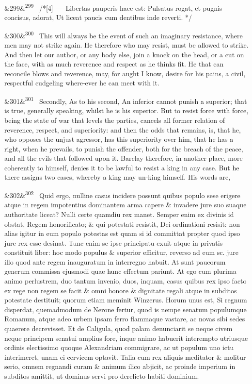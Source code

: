 \documentclass[12pt]{article}
\newcommand{\para}[1][]{\par\noindent\ifx&#1&\else\textsuperscript{\footnotesize #1}~\fi}
\begin{document}
\para[299] /*[4] -----Libertas pauperis haec est: Pulsatus rogat, et pugnis concisus, adorat, Ut liceat paucis cum dentibus inde reverti. */

\para[300] This will always be the event of such an imaginary resistance, where men may not strike again. He therefore who may resist, must be allowed to strike. And then let our author, or any body else, join a knock on the head, or a cut on the face, with as much reverence and respect as he thinks fit. He that can reconcile blows and reverence, may, for aught I know, desire for his pains, a civil, respectful cudgeling where-ever he can meet with it.

\para[301] Secondly, As to his second, An inferior cannot punish a superior; that is true, generally speaking, whilst he is his superior. But to resist force with force, being the state of war that levels the parties, cancels all former relation of reverence, respect, and superiority: and then the odds that remains, is, that he, who opposes the unjust agressor, has this superiority over him, that he has a right, when he prevails, to punish the offender, both for the breach of the peace, and all the evils that followed upon it. Barclay therefore, in another place, more coherently to himself, denies it to be lawful to resist a king in any case. But he there assigns two cases, whereby a king may un-king himself. His words are,

\para[302] Quid ergo, nulline casus incidere possunt quibus populo sese erigere atque in regem impotentius dominantem arma capere \& invadere jure suo suaque authoritate liceat? Nulli certe quamdiu rex manet. Semper enim ex divinis id obstat, Regem honorificato; \& qui potestati resistit, Dei ordinationi resisit: non alias igitur in eum populo potestas est quam si id committat propter quod ipso jure rex esse desinat. Tunc enim se ipse principatu exuit atque in privatis constituit liber: hoc modo populus \& superior efficitur, reverso ad eum sc. jure illo quod ante regem inauguratum in interregno habuit. At sunt paucorum generum commissa ejusmodi quae hunc effectum pariunt. At ego cum plurima animo perlustrem, duo tantum invenio, duos, inquam, casus quibus rex ipso facto ex rege non regem se facit \& omni honore \& dignitate regali atque in subditos potestate destituit; quorum etiam meminit Winzerus. Horum unus est, Si regnum disperdat, quemadmodum de Nerone fertur, quod is nempe senatum populumque Romanum, atque adeo urbem ipsam ferro flammaque vastare, ac novas sibi sedes quaerere decrevisset. Et de Caligula, quod palam denunciarit se neque civem neque principem senatui amplius fore, inque animo habuerit interempto utriusque ordinis electissimo quoque Alexandriam commigrare, ac ut populum uno ictu interimeret, unam ei cervicem optavit. Talia cum rex aliquis meditator \& molitur serio, omnem regnandi curam \& animum ilico abjicit, ac proinde imperium in subditos amittit, ut dominus servi pro derelicto habiti dominium.
\end{document}
